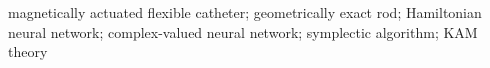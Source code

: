 magnetically actuated flexible catheter; geometrically exact rod; Hamiltonian neural network; complex-valued neural network; symplectic algorithm; KAM theory
